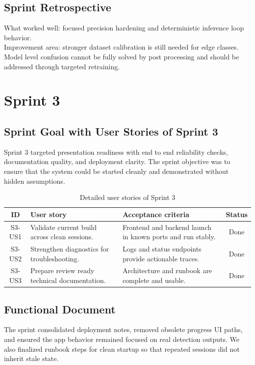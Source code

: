 \documentclass[12pt,a4paper]{report}
\begin{document}
\subsection{Sprint Retrospective}
What worked well: focused precision hardening and deterministic inference loop behavior.\\
Improvement area: stronger dataset calibration is still needed for edge classes. Model level confusion cannot be fully solved by post processing and should be addressed through targeted retraining.

\section{Sprint 3}
\subsection{Sprint Goal with User Stories of Sprint 3}
Sprint 3 targeted presentation readiness with end to end reliability checks, documentation quality, and deployment clarity. The sprint objective was to ensure that the system could be started cleanly and demonstrated without hidden assumptions.

\begin{table}[H]
    \centering
    \caption{Detailed user stories of Sprint 3}
    \begin{tabularx}{\textwidth}{|c|X|X|c|}
        \hline
        ID & User story & Acceptance criteria & Status \\
        \hline
        S3-US1 & Validate current build across clean sessions. & Frontend and backend launch in known ports and run stably. & Done \\
        \hline
        S3-US2 & Strengthen diagnostics for troubleshooting. & Logs and status endpoints provide actionable traces. & Done \\
        \hline
        S3-US3 & Prepare review ready technical documentation. & Architecture and runbook are complete and usable. & Done \\
        \hline
    \end{tabularx}
\end{table}

\subsection{Functional Document}
The sprint consolidated deployment notes, removed obsolete progress UI paths, and ensured the app behavior remained focused on real detection outputs. We also finalized runbook steps for clean startup so that repeated sessions did not inherit stale state.
\end{document}
